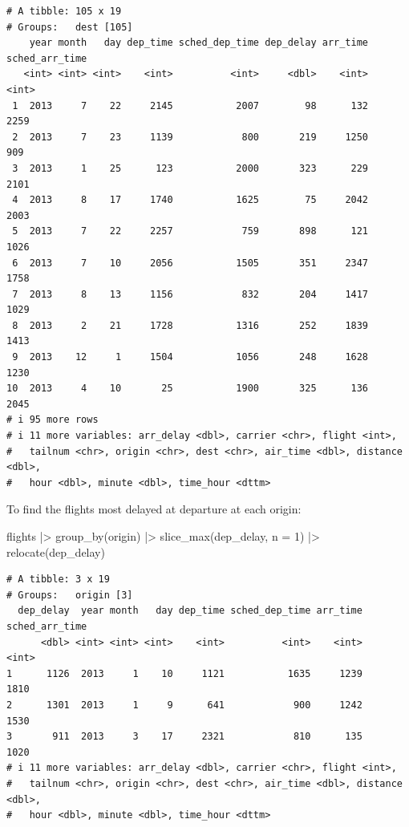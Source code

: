 \documentclass[
  letterpaper,
  DIV=11,
  numbers=noendperiod]{scrreprt}
\newenvironment{Shaded}{\begin{snugshade}}{\end{snugshade}}
\newcommand{\AttributeTok}[1]{\textcolor[rgb]{0.40,0.45,0.13}{#1}}
\newcommand{\DecValTok}[1]{\textcolor[rgb]{0.68,0.00,0.00}{#1}}
\newcommand{\FunctionTok}[1]{\textcolor[rgb]{0.28,0.35,0.67}{#1}}
\newcommand{\NormalTok}[1]{\textcolor[rgb]{0.00,0.23,0.31}{#1}}
\newcommand{\SpecialCharTok}[1]{\textcolor[rgb]{0.37,0.37,0.37}{#1}}
\begin{document}
\begin{verbatim}
# A tibble: 105 x 19
# Groups:   dest [105]
    year month   day dep_time sched_dep_time dep_delay arr_time sched_arr_time
   <int> <int> <int>    <int>          <int>     <dbl>    <int>          <int>
 1  2013     7    22     2145           2007        98      132           2259
 2  2013     7    23     1139            800       219     1250            909
 3  2013     1    25      123           2000       323      229           2101
 4  2013     8    17     1740           1625        75     2042           2003
 5  2013     7    22     2257            759       898      121           1026
 6  2013     7    10     2056           1505       351     2347           1758
 7  2013     8    13     1156            832       204     1417           1029
 8  2013     2    21     1728           1316       252     1839           1413
 9  2013    12     1     1504           1056       248     1628           1230
10  2013     4    10       25           1900       325      136           2045
# i 95 more rows
# i 11 more variables: arr_delay <dbl>, carrier <chr>, flight <int>,
#   tailnum <chr>, origin <chr>, dest <chr>, air_time <dbl>, distance <dbl>,
#   hour <dbl>, minute <dbl>, time_hour <dttm>
\end{verbatim}

To find the flights most delayed at departure at each origin:

\begin{Shaded}
\begin{Highlighting}[]
\NormalTok{flights }\SpecialCharTok{|\textgreater{}}
  \FunctionTok{group\_by}\NormalTok{(origin) }\SpecialCharTok{|\textgreater{}}
  \FunctionTok{slice\_max}\NormalTok{(dep\_delay, }\AttributeTok{n =} \DecValTok{1}\NormalTok{) }\SpecialCharTok{|\textgreater{}}
  \FunctionTok{relocate}\NormalTok{(dep\_delay)}
\end{Highlighting}
\end{Shaded}

\begin{verbatim}
# A tibble: 3 x 19
# Groups:   origin [3]
  dep_delay  year month   day dep_time sched_dep_time arr_time sched_arr_time
      <dbl> <int> <int> <int>    <int>          <int>    <int>          <int>
1      1126  2013     1    10     1121           1635     1239           1810
2      1301  2013     1     9      641            900     1242           1530
3       911  2013     3    17     2321            810      135           1020
# i 11 more variables: arr_delay <dbl>, carrier <chr>, flight <int>,
#   tailnum <chr>, origin <chr>, dest <chr>, air_time <dbl>, distance <dbl>,
#   hour <dbl>, minute <dbl>, time_hour <dttm>
\end{verbatim}
\end{document}
